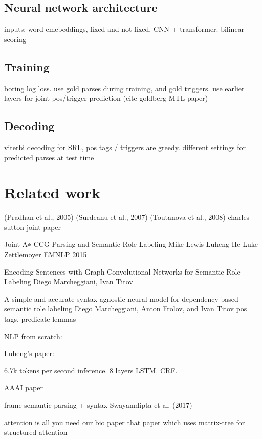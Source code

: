 \documentclass[11pt,a4paper]{article}
\begin{document}
\subsection{Neural network architecture}

inputs: word emebeddings, fixed and not fixed. CNN + transformer. bilinear scoring 

\subsection{Training}
boring log loss. use gold parses during training, and gold triggers. use earlier layers for joint pos/trigger prediction (cite goldberg MTL paper)

\subsection{Decoding}
viterbi decoding for SRL, pos tags / triggers are greedy. different settings for predicted parses at test time

\section{Related work}


(Pradhan et al., 2005)
(Surdeanu et al., 2007)
(Toutanova et al., 2008)
charles sutton joint paper

Joint A∗ CCG Parsing and Semantic Role Labeling
Mike Lewis Luheng He Luke Zettlemoyer
EMNLP 2015

Encoding Sentences with Graph Convolutional Networks
for Semantic Role Labeling
Diego Marcheggiani, Ivan Titov

 A simple and accurate syntax-agnostic neural
model for dependency-based semantic role labeling
Diego Marcheggiani, Anton Frolov, and Ivan Titov
pos tags, predicate lemmas

NLP from scratch: \citet{collobert2011natural}

Luheng's paper: \citet{he2017deep}

\citep{zhou2015end} 6.7k tokens per
second inference. 8 layers LSTM. CRF.

AAAI paper

frame-semantic parsing + syntax
Swayamdipta et al. (2017)

attention is all you need
our bio paper
that paper which uses matrix-tree for structured attention
\end{document}

